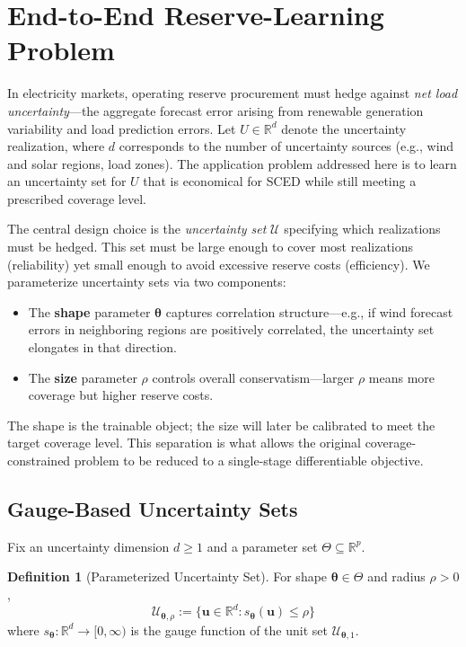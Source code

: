\documentclass[11pt]{article}
\newcommand{\R}{\mathbb{R}}
\newcommand{\cU}{\mathcal{U}}
\newcommand{\btheta}{\bm{\theta}}
\newcommand{\bu}{\bm{u}}
\theoremstyle{definition}
\newtheorem{definition}{Definition}
\begin{document}
\section{End-to-End Reserve-Learning Problem}
\label{sec:formulation}

In electricity markets, operating reserve procurement must hedge against \emph{net load uncertainty}---the aggregate forecast error arising from renewable generation variability and load prediction errors. Let $U \in \R^d$ denote the uncertainty realization, where $d$ corresponds to the number of uncertainty sources (e.g., wind and solar regions, load zones). The application problem addressed here is to learn an uncertainty set for $U$ that is economical for SCED while still meeting a prescribed coverage level.

The central design choice is the \emph{uncertainty set} $\cU$ specifying which realizations must be hedged. This set must be large enough to cover most realizations (reliability) yet small enough to avoid excessive reserve costs (efficiency). We parameterize uncertainty sets via two components:
\begin{itemize}
\item The \textbf{shape} parameter $\btheta$ captures correlation structure---e.g., if wind forecast errors in neighboring regions are positively correlated, the uncertainty set elongates in that direction.
\item The \textbf{size} parameter $\rho$ controls overall conservatism---larger $\rho$ means more coverage but higher reserve costs.
\end{itemize}
The shape is the trainable object; the size will later be calibrated to meet the target coverage level. This separation is what allows the original coverage-constrained problem to be reduced to a single-stage differentiable objective.

\subsection{Gauge-Based Uncertainty Sets}

Fix an uncertainty dimension $d \geq 1$ and a parameter set $\Theta \subseteq \R^p$.

\begin{definition}[Parameterized Uncertainty Set]
For shape $\btheta \in \Theta$ and radius $\rho > 0$,
\begin{equation}\label{eq:uset}
\cU_{\btheta,\rho} := \{\bu \in \R^d : s_{\btheta}(\bu) \leq \rho\}
\end{equation}
where $s_{\btheta}: \R^d \to [0,\infty)$ is the gauge function of the unit set $\cU_{\btheta,1}$.
\end{definition}
\end{document}
